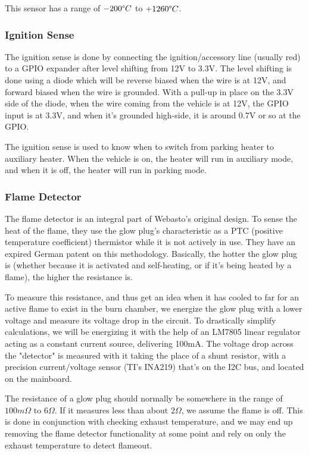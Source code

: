 \documentclass[lettersize,journal]{IEEEtran}
\begin{document}
This sensor has a range of $-200 \degree C$ to $+1260 \degree C$.

\subsubsection{Ignition Sense}
The ignition sense is done by connecting the ignition/accessory line (usually red) to a GPIO expander after level shifting from 12V to 3.3V.  The level shifting is done using a diode which will be reverse biased when the wire is at 12V, and forward biased when the wire is grounded.  With a pull-up in place on the 3.3V side of the diode, when the wire coming from the vehicle is at 12V, the GPIO input is at 3.3V, and when it's grounded high-side, it is around 0.7V or so at the GPIO.

The ignition sense is used to know when to switch from parking heater to auxiliary heater.   When the vehicle is on, the heater will run in auxiliary mode, and when it is off, the heater will run in parking mode.

\subsubsection{Flame Detector}
The flame detector is an integral part of Webasto's original design.  To sense the heat of the flame, they use the glow plug's characteristic as a PTC (positive temperature coefficient) thermistor while it is not actively in use.  They have an expired German patent on this methodology.  Basically, the hotter the glow plug is (whether because it is activated and self-heating, or if it's being heated by a flame), the higher the resistance is.

To measure this resistance, and thus get an idea when it has cooled to far for an active flame to exist in the burn chamber, we energize the glow plug with a lower voltage and measure its voltage drop in the circuit.  To drastically simplify calculations, we will be energizing it with the help of an LM7805 linear regulator acting as a constant current source, delivering 100mA.  The voltage drop across the "detector" is measured with it taking the place of a shunt resistor, with a precision current/voltage sensor (TI's INA219) that's on the I2C bus, and located on the mainboard.

The resistance of a glow plug should normally be somewhere in the range of $100 m \Omega$ to $6 \Omega$.  If it measures less than about $2 \Omega$, we assume the flame is off.  This is done in conjunction with checking exhaust temperature, and we may end up removing the flame detector functionality at some point and rely on only the exhaust temperature to detect flameout.
\end{document}
